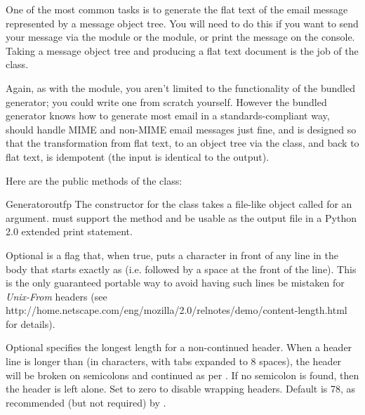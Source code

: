 
One of the most common tasks is to generate the flat text of the email
message represented by a message object tree.  You will need to do
this if you want to send your message via the 
module or the  module, or print the message on the
console.  Taking a message object tree and producing a flat text
document is the job of the  class.

Again, as with the  module, you aren't limited
to the functionality of the bundled generator; you could write one
from scratch yourself.  However the bundled generator knows how to
generate most email in a standards-compliant way, should handle MIME
and non-MIME email messages just fine, and is designed so that the
transformation from flat text, to an object tree via the
 class,
and back to flat text, is idempotent (the input is identical to the
output).

Here are the public methods of the  class:

\begin{classdesc}{Generator}{outfp}
The constructor for the  class takes a file-like
object called  for an argument.   must support
the  method and be usable as the output file in a
Python 2.0 extended print statement.

Optional  is a flag that, when true, puts a \samp{>}
character in front of any line in the body that starts exactly as
 (i.e.  followed by a space at the front of the
line).  This is the only guaranteed portable way to avoid having such
lines be mistaken for \emph{Unix-From} headers (see
{http://home.netscape.com/eng/mozilla/2.0/relnotes/demo/content-length.html}
for details).

Optional  specifies the longest length for a
non-continued header.  When a header line is longer than
 (in characters, with tabs expanded to 8 spaces),
the header will be broken on semicolons and continued as per
.  If no semicolon is found, then the header is left alone.
Set to zero to disable wrapping headers.  Default is 78, as
recommended (but not required) by .
\end{classdesc}

